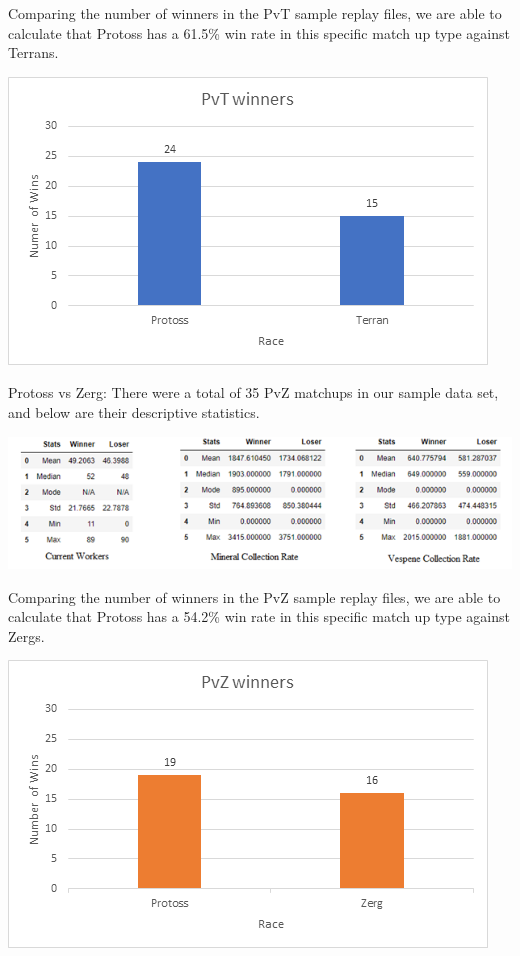 \documentclass[a4paper,12pt]{report}
\begin{document}
Comparing the number of winners in the PvT sample replay files, we are able to calculate that Protoss has a 61.5\% win rate in this specific match up type against Terrans.

\begin{center}
    \captionsetup{type=figure}
    \includegraphics[width=.9\linewidth]{media/PvTwinrate.png}
\end{center}

Protoss vs Zerg:
There were a total of 35 PvZ matchups in our sample data set, and below are their descriptive statistics. 

\begin{center}
    \captionsetup{type=figure}
    \includegraphics[width=.9\linewidth]{media/workersCollectionPvZ.png}
\end{center}

Comparing the number of winners in the PvZ sample replay files, we are able to calculate that Protoss has a 54.2\% win rate in this specific match up type against Zergs.

\begin{center}
    \captionsetup{type=figure}
    \includegraphics[width=.9\linewidth]{media/PvZwinners.png}
\end{center}
\end{document}

